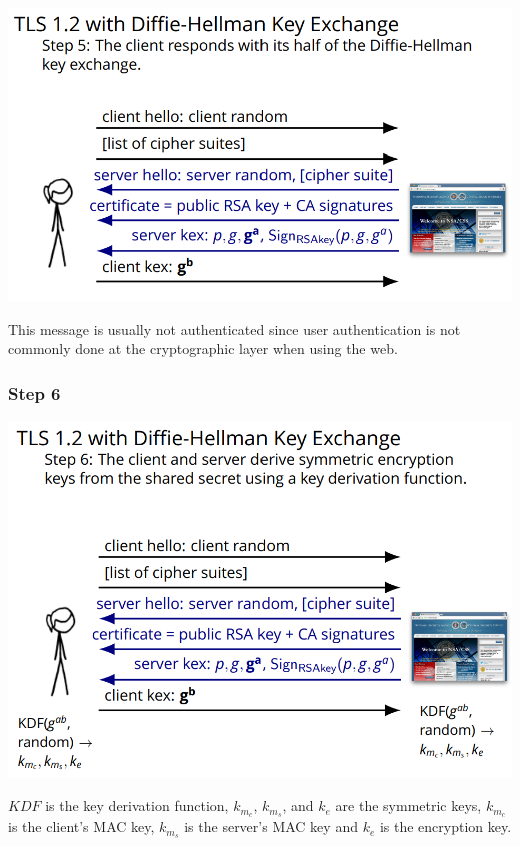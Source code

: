\documentclass[11pt]{article} %
\begin{document}
\begin{center}
	\includegraphics[scale=.8]{./DiffieStep5.png}
\end{center}

\noindent This message is usually not authenticated since user authentication is not 
commonly done at the cryptographic layer when using the web.

\subsubsection{Step 6}

\begin{center}
	\includegraphics[scale=.8]{./DiffieStep6.png}
\end{center}

\noindent $KDF$ is the key derivation function,
$k_{m_c}$, $k_{m_s}$, and $k_{e}$ are the symmetric keys,
$k_{m_c}$ is the client's MAC key, $k_{m_s}$ is the server's MAC key and $k_{e}$ 
is the encryption key.
\end{document}

